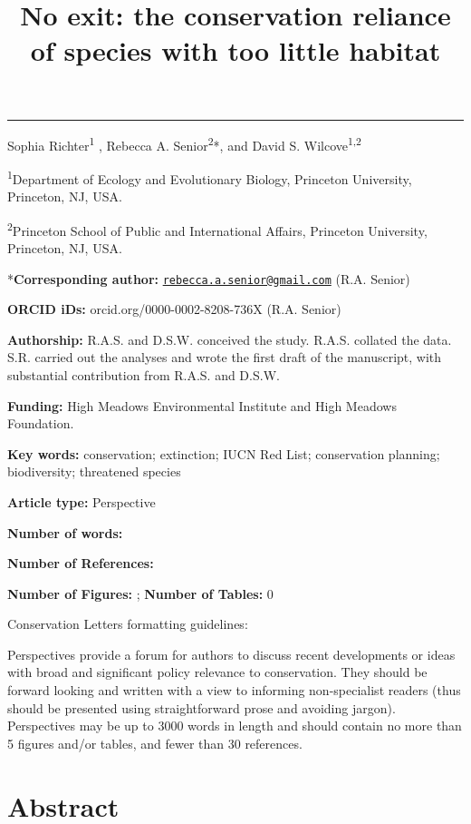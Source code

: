 \documentclass[
  12pt,
  british,
  a4paper,
]{article}
\title{No exit: the conservation reliance of species with too little habitat}
\author{}
\date{\vspace{-2.5em}}
\begin{document}
\maketitle

\begin{center}\rule{0.5\linewidth}{0.5pt}\end{center}

Sophia Richter\textsuperscript{1} , Rebecca A. Senior\textsuperscript{2}*, and David S. Wilcove\textsuperscript{1,2}

\textsuperscript{1}Department of Ecology and Evolutionary Biology, Princeton University, Princeton, NJ, USA.

\textsuperscript{2}Princeton School of Public and International Affairs, Princeton University, Princeton, NJ, USA.

*\textbf{Corresponding author:} \href{mailto:rebecca.a.senior@gmail.com}{\nolinkurl{rebecca.a.senior@gmail.com}} (R.A. Senior)

\textbf{ORCID iDs:} orcid.org/0000-0002-8208-736X (R.A. Senior)

\textbf{Authorship:} R.A.S. and D.S.W. conceived the study. R.A.S. collated the data. S.R. carried out the analyses and wrote the first draft of the manuscript, with substantial contribution from R.A.S. and D.S.W.

\textbf{Funding:} High Meadows Environmental Institute and High Meadows Foundation.

\textbf{Key words:} conservation; extinction; IUCN Red List; conservation planning; biodiversity; threatened species

\textbf{Article type:} Perspective

\textbf{Number of words:}

\textbf{Number of References:}

\textbf{Number of Figures:} ; \textbf{Number of Tables:} 0

Conservation Letters formatting guidelines:

Perspectives provide a forum for authors to discuss recent developments or ideas with broad and significant policy relevance to conservation. They should be forward looking and written with a view to informing non-specialist readers (thus should be presented using straightforward prose and avoiding jargon). Perspectives may be up to 3000 words in length and should contain no more than 5 figures and/or tables, and fewer than 30 references.

\hypertarget{abstract}{%
\section{Abstract}\label{abstract}}
\end{document}
